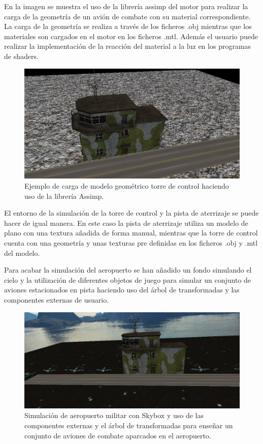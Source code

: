 \documentclass[a4paper, 17pt]{book}
\begin{document}
En la imagen se muestra el uso de la librería assimp del motor para realizar la carga de la geometría de un avión de combate con su
material correspondiente. La carga de la geometría se realiza a través de los ficheros .obj mientras que los materiales son cargados
en el motor en los ficheros .mtl. Además el usuario puede realizar la implementación de la reacción del material a la luz en los programas
de shaders.

\begin{figure}[H]
    \centering
    \includegraphics[scale=0.25, keepaspectratio]{img/Tower.png}
    \caption{Ejemplo de carga de modelo geométrico torre de control haciendo uso de la librería Assimp.}
    \label{figura:Avion}
\end{figure}

El entorno de la simulación de la torre de control y la pista de aterrizaje se puede hacer de igual manera. En este caso la pista de aterrizaje
utiliza un modelo de plano con una textura añadida de forma manual, mientras que la torre de control cuenta con una geometría y unas texturas
pre definidas en los ficheros .obj y .mtl del modelo.

\vspace{1mm} %

Para acabar la simulación del aeropuerto se han añadido un fondo simulando el cielo y la utilización de diferentes objetos de juego para
simular un conjunto de aviones estacionados en pista haciendo uso del árbol de transformadas y las componentes externas de usuario.

\begin{figure}[H]
    \centering
    \includegraphics[scale=0.25, keepaspectratio]{img/AirportMultiplePlanes.png}
    \caption{Simulación de aeropuerto militar con Skybox y uso de las componentes externas y el árbol de transformadas para enseñar un
    conjunto de aviones de combate aparcados en el aeropuerto.}
    \label{figura:Avion}
\end{figure}
\end{document}
